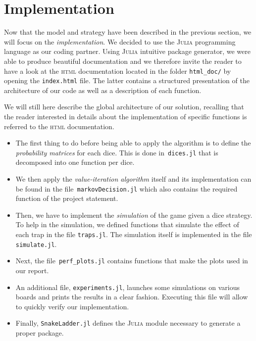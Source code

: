 \section{Implementation} %
\label{sec:implementation}
Now that the model and strategy have been described in the previous
section, we will focus on the \emph{implementation}.
We decided to use the \textsc{Julia}
programming language as our coding partner.
Using \textsc{Julia} intuitive package generator, we were able to
produce beautiful documentation and we therefore invite
the reader to have a look at the \textsc{html} documentation located
in the folder \lstinline|html_doc/| by opening the \texttt{index.html} file.
The latter contains a structured presentation of the architecture
of our code as well as a description of each function.

We will still here describe the global architecture of our solution,
recalling that the reader interested in details about the implementation of
specific functions is referred to the \textsc{html} documentation. 

\begin{itemize}
  \item The first thing to do before being able to apply the algorithm
  is to define the \emph{probability matrices} for each dice. 
  This is done in~\texttt{dices.jl} that is decomposed into one function per dice. 
  
  \item We then apply the \emph{value-iteration algorithm} itself and its
  implementation can be found in the file~\texttt{markovDecision.jl}
  which also contains the required function of the project statement. 
  
  \item Then, we have to implement the \emph{simulation} of the game given a dice strategy.
  To help in the simulation, we defined functions that simulate the effect
  of each trap in the file \texttt{traps.jl}. The simulation itself is
  implemented in the file \texttt{simulate.jl}. 
  
  \item Next, the file~\texttt{perf\_plots.jl} contains functions
  that make the plots used in our report. 
  
  \item An additional file, \texttt{experiments.jl}, launches some simulations
  on various boards and prints the results in a clear fashion.
  Executing this file will allow to quickly verify our implementation.
  
  \item Finally, \texttt{SnakeLadder.jl} defines the \textsc{Julia} module
  necessary to generate a proper package. 
\end{itemize}

